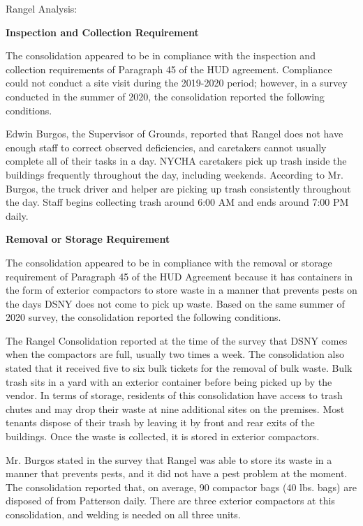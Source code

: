 Rangel Analysis: 

\textbf{Inspection and Collection Requirement} 

 

The consolidation appeared to be in compliance with the inspection and collection requirements of Paragraph 45 of the HUD agreement. Compliance could not conduct a site visit during the 2019-2020 period; however, in a survey conducted in the summer of 2020, the consolidation reported the following conditions.

Edwin Burgos, the Supervisor of Grounds, reported that Rangel does not have enough staff to correct observed deficiencies, and caretakers cannot usually complete all of their tasks in a day. NYCHA caretakers pick up trash inside the buildings frequently throughout the day, including weekends. According to Mr. Burgos, the truck driver and helper are picking up trash consistently throughout the day.  Staff begins collecting trash around 6:00 AM and ends around 7:00 PM daily.

 

\textbf{Removal or Storage Requirement} 

The consolidation appeared to be in compliance with the removal or storage requirement of Paragraph  45 of the HUD Agreement because it has containers in the form of exterior compactors to store waste in a manner that prevents pests on the days DSNY does not come to pick up waste. Based on the same summer of  2020 survey, the consolidation reported the following conditions.

 

The Rangel Consolidation reported at the time of the survey that DSNY comes when the compactors are full, usually two times a week. The consolidation also stated that it received five to six bulk tickets for the removal of bulk waste. Bulk trash sits in a yard with an exterior container before being picked up by the vendor. In terms of storage, residents of this consolidation have access to trash chutes and may drop their waste at nine additional sites on the premises.  Most tenants dispose of their trash by leaving it by front and rear exits of the buildings. Once the waste is collected, it is stored in exterior compactors.

 

Mr. Burgos stated in the survey that Rangel was able to store its waste in a manner that prevents pests, and it did not have a pest problem at the moment. The consolidation reported that, on average, 90 compactor bags (40 lbs. bags)  are disposed of from Patterson daily. There are three exterior compactors at this consolidation, and welding is needed on all three units. 


